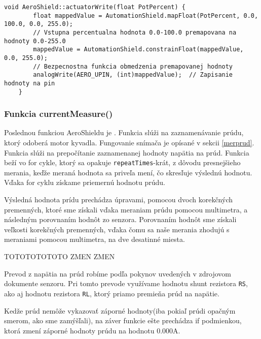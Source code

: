	
\begin{lstlisting}[caption={Zdrojový kód funkcie actuatorWrite.},captionpos=b]
	void AeroShield::actuatorWrite(float PotPercent) {   
		float mappedValue = AutomationShield.mapFloat(PotPercent, 0.0, 100.0, 0.0, 255.0);       
		// Vstupna percentualna hodnota 0.0-100.0 premapovana na hodnoty 0.0-255.0
		mappedValue = AutomationShield.constrainFloat(mappedValue, 0.0, 255.0);  
		// Bezpecnostna funkcia obmedzenia premapovanej hodnoty
		analogWrite(AERO_UPIN, (int)mappedValue);  // Zapisanie hodnoty na pin
	}
\end{lstlisting}
	
	
\subsubsection{Funkcia currentMeasure()}	
	
Poslednou funkciou AeroShieldu je . Funkcia slúži na zaznamenávanie prúdu, ktorý odoberá motor kyvadla. Fungovanie snímača je opísané v sekcii \ref{merprud}. Funkcia slúži na prepočítanie zaznamenanej hodnoty napätia na prúd. Funkcia beží vo for cykle, ktorý sa opakuje \verb|repeatTimes|-krát, z dôvodu presnejšieho merania, keďže meraná hodnota sa priveľa mení, čo skresľuje výslednú hodnotu. Vďaka for cyklu získame priemernú hodnotu prúdu. 

Výsledná hodnota prídu prechádza úpravami, pomocou dvoch korekčných premenných, ktoré sme získali vďaka meraniam prúdu pomocou multimetra, a následným porovnaním hodnôt zo senzora. Porovnaním hodnôt sme získali veľkosti korekčných premenných, vďaka čomu sa naše merania zhodujú s meraniami pomocou multimetra, na dve desatinné miesta. 

TOTOTOTOTOTO ZMEN ZMEN 

Prevod z napätia na prúd robíme podľa pokynov uvedených v zdrojovom dokumente senzoru. Pri tomto prevode využívame hodnotu shunt rezistora \verb|RS|, ako aj hodnotu rezistora \verb|RL|, ktorý priamo premieňa prúd na napätie. 

Kedže prúd nemôže vykazovať záporné hodnoty(iba pokiaľ prúdi opačným smerom, ako sme zamýšľali), na záver funkcie ešte prechádza if podmienkou, ktorá zmení záporné hodnoty prúdu na hodnotu 0.000A.  
	

